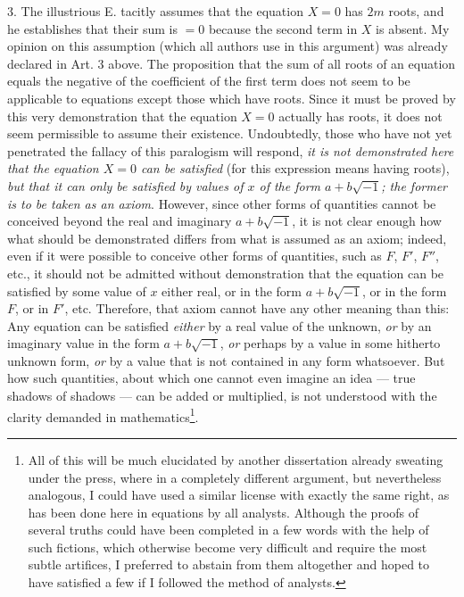 \documentclass[12pt]{memoir}
\theoremstyle{plain}
\theoremstyle{remark}
\begin{document}
3. The illustrious \textsc{E.} tacitly assumes that the equation \(X=0\) has \(2m\) roots, and he establishes that their sum is \(= 0\) because the second term in \(X\) is absent. My opinion on this assumption (which all authors use in this argument) was already declared in Art. 3 above. The proposition that the sum of all roots of an equation equals the negative of the coefficient of the first term does not seem to be applicable to equations except those which have roots. Since it must be proved by this very demonstration that the equation \(X=0\) actually has roots, it does not seem permissible to assume their existence. Undoubtedly, those who have not yet penetrated the fallacy of this paralogism will respond, \textit{it is not demonstrated here that the equation \(X=0\) can be satisfied} (for this expression means having roots), \textit{but that it can only be satisfied by values of \(x\) of the form \(a + b \surd{-1}\); the former is to be taken as an axiom}. However, since other forms of quantities cannot be conceived beyond the real and imaginary \(a + b \surd{-1}\), it is not clear enough how what should be demonstrated differs from what is assumed as an axiom; indeed, even if it were possible to conceive other forms of quantities, such as \(F\), \(F'\), \(F''\), etc., it should not be admitted without demonstration that the equation can be satisfied by some value of \(x\) either real, or in the form \(a + b \surd{-1}\), or in the form \(F\), or in \(F'\), etc. Therefore, that axiom cannot have any other meaning than this: Any equation can be satisfied \textit{either} by a real value of the unknown, \textit{or} by an imaginary value in the form \(a + b \surd{-1}\), \textit{or} perhaps by a value in some hitherto unknown form, \textit{or} by a value that is not contained in any form whatsoever. But how such quantities, about which one cannot even imagine an idea — true shadows of shadows — can be added or multiplied, is not understood with the clarity demanded in mathematics\footnote{All of this will be much elucidated by another dissertation already sweating under the press, where in a completely different argument, but nevertheless analogous, I could have used a similar license with exactly the same right, as has been done here in equations by all analysts. Although the proofs of several truths could have been completed in a few words with the help of such fictions, which otherwise become very difficult and require the most subtle artifices, I preferred to abstain from them altogether and hoped to have satisfied a few if I followed the method of analysts.}.
\end{document}
